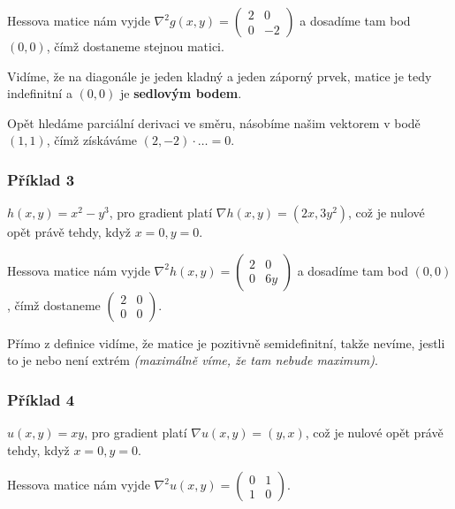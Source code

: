 \vspace{6pt}
\noindent Hessova matice nám vyjde $\nabla^2 g(x, y) = \begin{pmatrix}
    2 & 0 \\
    0 & -2
\end{pmatrix}$ a dosadíme tam bod $(0, 0)$, čímž dostaneme stejnou matici.

\vspace{6pt}
\noindent Vidíme, že na diagonále je jeden kladný a jeden záporný prvek, matice je tedy indefinitní a $(0,0)$ je \textbf{sedlovým bodem}.

\vspace{6pt}
\noindent Opět hledáme parciální derivaci ve směru, násobíme našim vektorem v bodě $(1,1)$, čímž získáváme $(2,-2) \cdot \ldots = 0$.

\subsubsection*{Příklad 3}

$h(x,y) = x^2 - y^3$, pro gradient platí $\nabla h(x, y) = (2x, 3y^2)$, což je nulové opět právě tehdy, když $x = 0, y = 0$.

\vspace{6pt}
\noindent Hessova matice nám vyjde $\nabla^2 h(x, y) = \begin{pmatrix}
    2 & 0 \\
    0 & 6y
\end{pmatrix}$ a dosadíme tam bod $(0, 0)$, čímž dostaneme $\begin{pmatrix}
    2 & 0 \\
    0 & 0
\end{pmatrix}$.

\vspace{6pt}
\noindent Přímo z definice vidíme, že matice je pozitivně semidefinitní, takže nevíme, jestli to je nebo není extrém \textit{(maximálně víme, že tam nebude maximum)}.

\subsubsection*{Příklad 4}

$u(x,y) = xy$, pro gradient platí $\nabla u(x, y) = (y, x)$, což je nulové opět právě tehdy, když $x = 0, y = 0$.

\vspace{6pt}
\noindent Hessova matice nám vyjde $\nabla^2 u(x, y) = \begin{pmatrix}
    0 & 1 \\
    1 & 0
\end{pmatrix}$.

